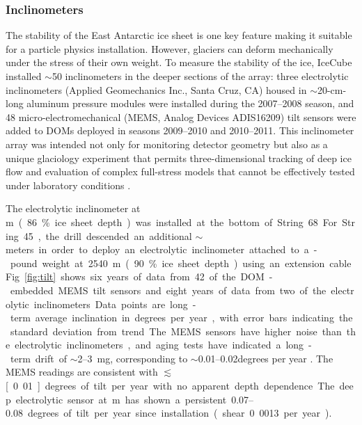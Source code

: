 \subsubsection{Inclinometers}

The stability of the East Antarctic ice sheet is one key feature making it
suitable for a particle physics installation.  However, glaciers can
deform mechanically under the stress of their own weight.  To measure the
stability of the ice, IceCube installed $\sim$50
inclinometers in the deeper sections of the array: three 
electrolytic inclinometers (Applied Geomechanics Inc., Santa Cruz, CA)
housed in $\sim$20-cm-long aluminum pressure modules were installed during
the 2007--2008 season, and 48 micro-electromechanical (MEMS, Analog Devices
ADIS16209) tilt sensors were added to DOMs deployed in seasons 2009--2010 and
2010--2011.  This inclinometer array was intended not only for monitoring
detector geometry but also as a unique glaciology experiment that
permits three-dimensional tracking of deep ice flow and evaluation of complex
full-stress models that cannot be effectively tested under laboratory
conditions \cite{pattyn03}.

The electrolytic inclinometer at \unit[2455]m (86\% ice sheet depth) was
installed at the bottom of String 68.  For String 45, the drill
descended an additional $\sim$\unit[100]meters in order to deploy an
electrolytic inclinometer attached to a \unit[100]-pound weight at 2540 m
(90\% ice sheet depth) using an extension cable.  Fig.~\ref{fig:tilt} shows
six years of data from 42 of the DOM-embedded MEMS tilt sensors and
eight years of data from two of the electrolytic inclinometers.  Data
points are long-term average inclination in degrees per year, with error
bars indicating the standard deviation from trend.  The MEMS sensors have
higher noise than the electrolytic inclinometers, and aging tests have indicated a long-term
drift of $\sim$\numrange[range-phrase = --]{2}{3}~mg, corresponding to
$\sim$\numrange[range-phrase = --]{0.01}{0.02}degrees per year
\cite{inclinometer_comm}. The MEMS readings are consistent with
$\lesssim$\unit[0.01]degrees of tilt per year with no apparent depth
dependence.  The deep electrolytic sensor 
at \unit[2540]m has shown a persistent \numrange[range-phrase =
  --]{0.07}{0.08} degrees of tilt per year since installation (shear 0.0013
per year).

